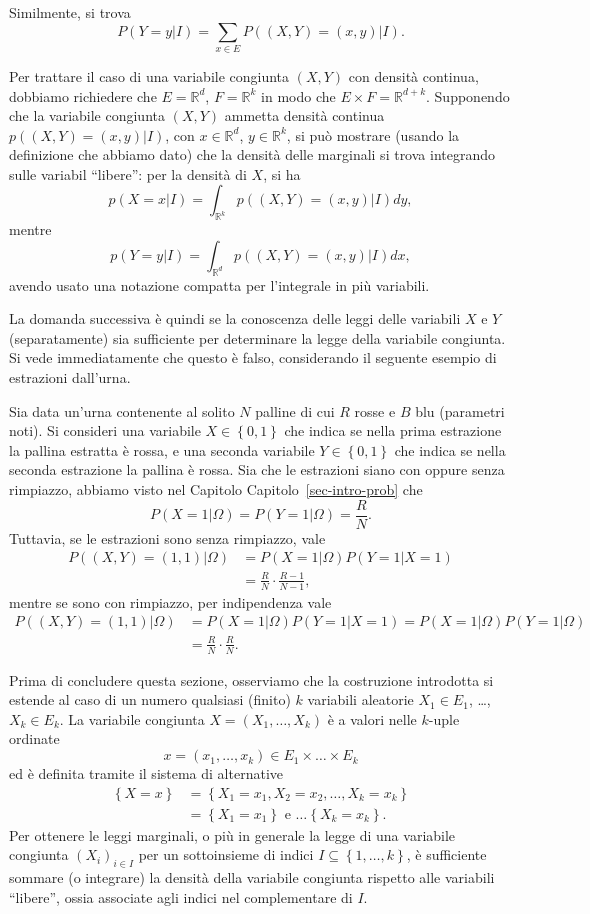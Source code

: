 \documentclass[
  italian,
  letterpaper,
]{book}
\newcommand{\cur}[1]{\left\{ #1 \right\}}
\newcommand{\R}{\mathbb{R}}
\theoremstyle{definition}
\theoremstyle{remark}
\begin{document}
Similmente, si trova
\[ P(Y = y | I) = \sum_{x \in E} P( (X,Y) = (x,y) |I).\]

Per trattare il caso di una variabile congiunta \((X,Y)\) con densità
continua, dobbiamo richiedere che \(E = \R^{d}\), \(F = \R^{k}\) in modo
che \(E\times F = \R^{d+k}\). Supponendo che la variabile congiunta
\((X,Y)\) ammetta densità continua \(p((X,Y) = (x,y)|I)\), con
\(x \in \R^d\), \(y\in \R^k\), si può mostrare (usando la definizione
che abbiamo dato) che la densità delle marginali si trova integrando
sulle variabil ``libere'': per la densità di \(X\), si ha
\[ p(X = x | I) = \int_{\R^k} p( (X,Y)= (x,y) |I) d y,\] mentre
\[ p(Y = y | I) = \int_{\R^d} p( (X,Y) = (x,y) |I) d x,\] avendo usato
una notazione compatta per l'integrale in più variabili.

La domanda successiva è quindi se la conoscenza delle leggi delle
variabili \(X\) e \(Y\) (separatamente) sia sufficiente per determinare
la legge della variabile congiunta. Si vede immediatamente che questo è
falso, considerando il seguente esempio di estrazioni dall'urna.

Sia data un'urna contenente al solito \(N\) palline di cui \(R\) rosse e
\(B\) blu (parametri noti). Si consideri una variabile
\(X \in \cur{0,1}\) che indica se nella prima estrazione la pallina
estratta è rossa, e una seconda variabile \(Y \in \cur{0,1}\) che indica
se nella seconda estrazione la pallina è rossa. Sia che le estrazioni
siano con oppure senza rimpiazzo, abbiamo visto nel Capitolo
Capitolo~\ref{sec-intro-prob} che
\[ P(X = 1 | \Omega) = P(Y = 1 | \Omega ) = \frac{R}{N}.\] Tuttavia, se
le estrazioni sono senza rimpiazzo, vale
\[\begin{split} P((X,Y) = (1,1) |\Omega) & = P(X = 1 |\Omega) P(Y = 1 | X=1) \\
& = \frac{R}{N} \cdot \frac{R-1}{N-1},\end{split}\] mentre se sono con
rimpiazzo, per indipendenza vale
\[ \begin{split} P((X,Y) = (1,1) |\Omega) &= P(X = 1 |\Omega) P(Y = 1 | X=1) =P(X = 1 |\Omega) P(Y = 1 | \Omega) \\
& = \frac{R}{N} \cdot \frac{R}{N}.
\end{split}\]

Prima di concludere questa sezione, osserviamo che la costruzione
introdotta si estende al caso di un numero qualsiasi (finito) \(k\)
variabili aleatorie \(X_1\in E_1\), \ldots, \(X_k \in E_k\). La
variabile congiunta \(X = (X_1, \ldots, X_k)\) è a valori nelle
\(k\)-uple ordinate
\[x = (x_1, \ldots, x_k) \in E_1 \times \ldots \times E_k\] ed è
definita tramite il sistema di alternative
\[\begin{split} \cur{ X = x} & = \cur{X_1 = x_1, X_2=x_2, \ldots, X_k = x_k} \\
& = \cur{X_1 = x_1} \text{ e } \ldots  \cur{X_k = x_k}.\end{split}\] Per
ottenere le leggi marginali, o più in generale la legge di una variabile
congiunta \((X_i)_{i \in I}\) per un sottoinsieme di indici
\(I \subseteq \cur{1, \ldots, k}\), è sufficiente sommare (o integrare)
la densità della variabile congiunta rispetto alle variabili ``libere'',
ossia associate agli indici nel complementare di \(I\).
\end{document}
